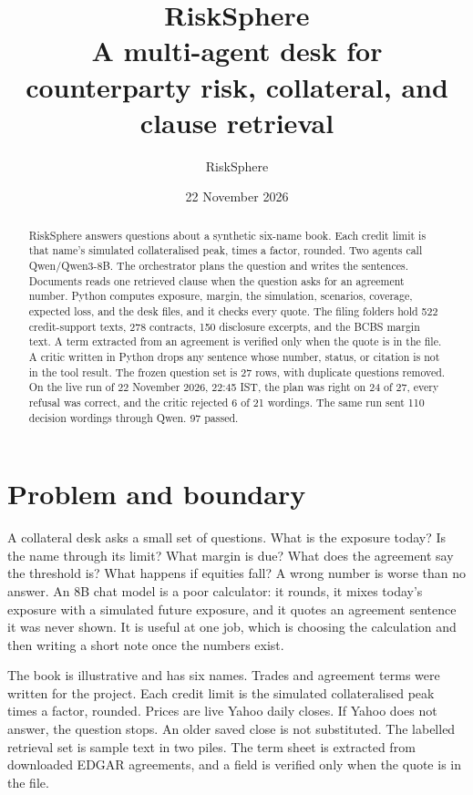 \documentclass[11pt,a4paper]{article}
\title{RiskSphere\\[0.25em]
\large A multi-agent desk for counterparty risk, collateral, and clause retrieval}
\author{RiskSphere}
\date{22 November 2026}
\begin{document}
\maketitle
\vspace{-1.6em}
\begin{abstract}
\noindent
RiskSphere answers questions about a synthetic six-name book. Each credit limit is that name's simulated collateralised peak, times a factor, rounded. Two agents call Qwen/Qwen3-8B. The orchestrator plans the question and writes the sentences. Documents reads one retrieved clause when the question asks for an agreement number. Python computes exposure, margin, the simulation, scenarios, coverage, expected loss, and the desk files, and it checks every quote. The filing folders hold 522 credit-support texts, 278 contracts, 150 disclosure excerpts, and the BCBS margin text. A term extracted from an agreement is verified only when the quote is in the file. A critic written in Python drops any sentence whose number, status, or citation is not in the tool result. The frozen question set is 27 rows, with duplicate questions removed. On the live run of 22 November 2026, 22:45 IST, the plan was right on 24 of 27, every refusal was correct, and the critic rejected 6 of 21 wordings. The same run sent 110 decision wordings through Qwen. 97 passed.
\end{abstract}

\section{Problem and boundary}

A collateral desk asks a small set of questions. What is the exposure today? Is the name through its limit? What margin is due? What does the agreement say the threshold is? What happens if equities fall? A wrong number is worse than no answer. An 8B chat model is a poor calculator: it rounds, it mixes today's exposure with a simulated future exposure, and it quotes an agreement sentence it was never shown. It is useful at one job, which is choosing the calculation and then writing a short note once the numbers exist.

The book is illustrative and has six names. Trades and agreement terms were written for the project. Each credit limit is the simulated collateralised peak times a factor, rounded. Prices are live Yahoo daily closes. If Yahoo does not answer, the question stops. An older saved close is not substituted. The labelled retrieval set is sample text in two piles. The term sheet is extracted from downloaded EDGAR agreements, and a field is verified only when the quote is in the file.
\end{document}
